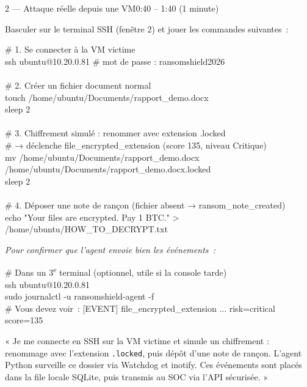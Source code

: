 \documentclass[a4paper,11pt]{article}
\begin{document}
\begin{etapebox}{2 --- Attaque réelle depuis une VM}{0:40 -- 1:40 \textnormal{(1 minute)}}

\begin{montrerbox}
Basculer sur le terminal SSH (fenêtre 2) et jouer les commandes suivantes~:
\end{montrerbox}

\begin{cmdbox}
\# 1. Se connecter à la VM victime\\
ssh ubuntu@10.20.0.81     \# mot de passe : ransomshield2026\\
\\
\# 2. Créer un fichier document normal\\
touch /home/ubuntu/Documents/rapport\_demo.docx\\
sleep 2\\
\\
\# 3. Chiffrement simulé : renommer avec extension .locked\\
\#    → déclenche file\_encrypted\_extension (score 135, niveau Critique)\\
mv /home/ubuntu/Documents/rapport\_demo.docx /home/ubuntu/Documents/rapport\_demo.docx.locked\\
sleep 2\\
\\
\# 4. Déposer une note de rançon (fichier absent → ransom\_note\_created)\\
echo "Your files are encrypted. Pay 1 BTC." > /home/ubuntu/HOW\_TO\_DECRYPT.txt
\end{cmdbox}

\vspace{3pt}
\textit{\small Pour confirmer que l'agent envoie bien les événements~:}
\begin{cmdbox}
\# Dans un 3\textsuperscript{e} terminal (optionnel, utile si la console tarde)\\
ssh ubuntu@10.20.0.81\\
sudo journalctl -u ransomshield-agent -f\\
\# Vous devez voir~: [EVENT] file\_encrypted\_extension ... risk=critical score=135
\end{cmdbox}

\vspace{4pt}

\begin{direbox}
« Je me connecte en SSH sur la VM victime et simule un chiffrement :
renommage avec l'extension \texttt{.locked}, puis dépôt d'une note de rançon.
L'agent Python surveille ce dossier via Watchdog et inotify.
Ces événements sont placés dans la file locale SQLite, puis transmis au SOC via l'API sécurisée. »
\end{direbox}

\end{etapebox}
\end{document}
